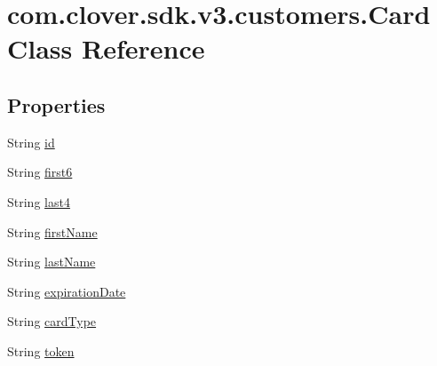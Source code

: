 \hypertarget{classcom_1_1clover_1_1sdk_1_1v3_1_1customers_1_1_card}{}\section{com.\+clover.\+sdk.\+v3.\+customers.\+Card Class Reference}
\label{classcom_1_1clover_1_1sdk_1_1v3_1_1customers_1_1_card}
\subsection*{Properties}
\begin{DoxyCompactItemize}
\item 
String \hyperlink{classcom_1_1clover_1_1sdk_1_1v3_1_1customers_1_1_card_a0eceb86d271a1f40543d4c8aa8c59326}{id}
\item 
String \hyperlink{classcom_1_1clover_1_1sdk_1_1v3_1_1customers_1_1_card_a6adbf4ed8d0c44c7c4951244a5e760a4}{first6}
\item 
String \hyperlink{classcom_1_1clover_1_1sdk_1_1v3_1_1customers_1_1_card_a88ced965ffe0fa39f9ef61e4f3f357b2}{last4}
\item 
String \hyperlink{classcom_1_1clover_1_1sdk_1_1v3_1_1customers_1_1_card_ac46b6ca9992643cbc76bbf1250a3a418}{first\+Name}
\item 
String \hyperlink{classcom_1_1clover_1_1sdk_1_1v3_1_1customers_1_1_card_adafbe217a2a181ee490d15d3bced098d}{last\+Name}
\item 
String \hyperlink{classcom_1_1clover_1_1sdk_1_1v3_1_1customers_1_1_card_a6f1b9bcfc6c3535fd847473e8950919d}{expiration\+Date}
\item 
String \hyperlink{classcom_1_1clover_1_1sdk_1_1v3_1_1customers_1_1_card_aa15bd95aa3440fcea4c73205b16134f1}{card\+Type}
\item 
String \hyperlink{classcom_1_1clover_1_1sdk_1_1v3_1_1customers_1_1_card_a3647ce62b76a7f61a2b4e92d55f4badc}{token}
\end{DoxyCompactItemize}


